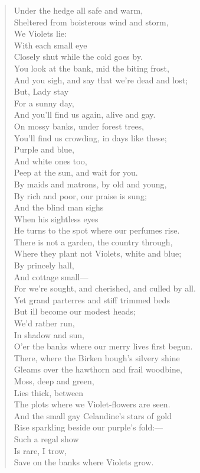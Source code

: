 \documentclass[11pt,twoside]{article}
\begin{document}
\begin{verse}
Under the hedge all safe and warm,\\
Sheltered from boisterous wind and storm,\\
\quad We Violets lie:\\
\quad With each small eye\\
Closely shut while the cold goes by.\\
You look at the bank, mid the biting frost,\\
And you sigh, and say that we’re dead and lost;\\
\quad But, Lady stay\\
\quad For a sunny day,\\
And you’ll find us again, alive and gay.\\
On mossy banks, under forest trees,\\
You’ll find us crowding, in days like these;\\
\quad Purple and blue,\\
\quad And white ones too,\\
Peep at the sun, and wait for you.\\
By maids and matrons, by old and young,\\
By rich and poor, our praise is sung;\\
\quad And the blind man sighs\\
\quad When his sightless eyes\\
He turns to the spot where our perfumes rise.\\
There is not a garden, the country through,\\
Where they plant not Violets, white and blue;\\
\quad By princely hall,\\
\quad And cottage small---\\
For we’re sought, and cherished, and culled by all.\\
Yet grand parterres and stiff trimmed beds\\
But ill become our modest heads;\\
\quad We’d rather run,\\
\quad In shadow and sun,\\
O’er the banks where our merry lives first begun.\\
There, where the Birken bough’s silvery shine\\
Gleams over the hawthorn and frail woodbine,\\
\quad Moss, deep and green,\\
\quad Lies thick, between\\
The plots where we Violet-flowers are seen.\\
And the small gay Celandine’s stars of gold\\
Rise sparkling beside our purple’s fold:---\\
\quad Such a regal show\\
\quad Is rare, I trow,\\
Save on the banks where Violets grow.
\end{verse}
\end{document}
